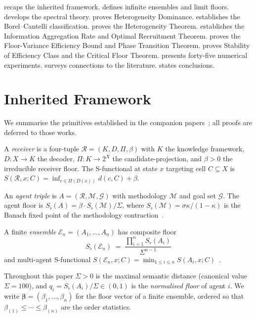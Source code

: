 \documentclass[twocolumn,11pt,a4paper]{article}
\theoremstyle{remark}
\newcommand{\Sflat}{S_{\flat}}
\newcommand{\Rec}{\mathcal{R}}
\newcommand{\Meth}{\mathcal{M}}
\newcommand{\Goal}{\mathcal{G}}
\newcommand{\Ens}{\mathcal{E}}
\begin{document}
 recaps the inherited framework.
 defines infinite ensembles and limit floors.
 develops the spectral theory.
 proves Heterogeneity Dominance.
 establishes the Borel--Cantelli classification.
 proves the Heterogeneity Theorem.
 establishes the Information Aggregation Rate and Optimal
Recruitment Theorem.
 proves the Floor-Variance Efficiency Bound and Phase
Transition Theorem.
 proves Stability of Efficiency Class and the Critical
Floor Theorem.
 presents forty-five numerical experiments.
 surveys connections to the literature.
 states conclusions.

\section{Inherited Framework}
\label{sec:prelim}

We summarise the primitives established in the companion
papers~\cite{sachikonye2025agents,sachikonye2025market}; all proofs are
deferred to those works.

A \emph{receiver} is a four-tuple $\Rec = (K,D,\Pi,\beta)$ with $K$ the
knowledge framework, $D: X \to K$ the decoder, $\Pi: K \to 2^X$ the
candidate-projection, and $\beta > 0$ the irreducible receiver floor.  The
S-functional at state $x$ targeting cell $C \subseteq X$ is
$S(\Rec,x;C) = \inf_{c\in\Pi(D(x))} d(c,C) + \beta$.

An \emph{agent triple} is $A = (\Rec,\Meth,\Goal)$ with methodology
$\Meth$ and goal set $\Goal$.  The agent floor is
$\Sflat(A) = \beta \cdot \Sflat(\Meth)/\Sigma$, where
$\Sflat(\Meth) = \sigma\kappa/(1-\kappa)$ is the Banach fixed point of the
methodology contraction~\cite{sachikonye2025agents}.

A finite \emph{ensemble} $\Ens_n = (A_1,\ldots,A_n)$ has composite floor
\begin{equation}
  \Sflat(\Ens_n) \;=\; \frac{\prod_{i=1}^n \Sflat(A_i)}{\Sigma^{n-1}}
  \label{eq:composite-floor}
\end{equation}
and multi-agent S-functional
$S(\Ens_n,x;C) = \min_{1\le i\le n} S(A_i,x;C)$~\cite{sachikonye2025market}.

Throughout this paper $\Sigma > 0$ is the maximal semantic distance
(canonical value $\Sigma = 100$), and $q_i = \Sflat(A_i)/\Sigma \in (0,1)$
is the \emph{normalised floor} of agent $i$.  We write
$\boldsymbol\beta = (\beta_1,\ldots,\beta_n)$ for the floor vector of a
finite ensemble, ordered so that $\beta_{(1)} \le \cdots \le \beta_{(n)}$
are the order statistics.
\end{document}
